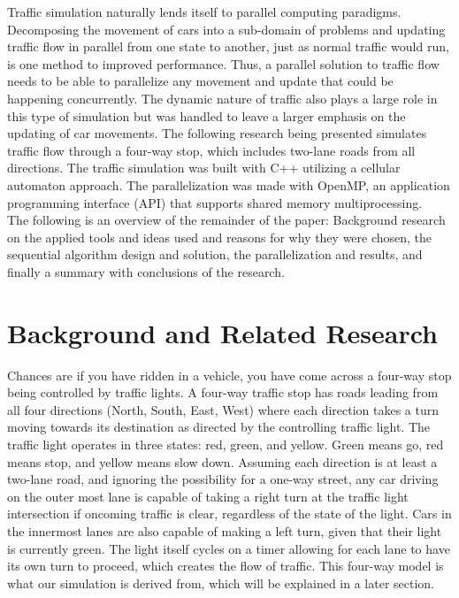 \documentclass[conference]{IEEEtran}
\begin{document}
Traffic simulation naturally lends itself to parallel computing paradigms. Decomposing the movement of cars into a sub-domain of problems and updating traffic flow in parallel from one state to another, just as normal traffic would run, is one method to improved performance. 
Thus, a parallel solution to traffic flow needs to be able to parallelize any movement and update that could be happening concurrently. The dynamic nature of traffic also plays a large role in this type of simulation but was handled to leave a larger emphasis on the updating of car movements. The following research being presented simulates traffic flow through a four-way stop, which includes two-lane roads from all directions. The traffic simulation was built with C++ utilizing a cellular automaton approach.  The parallelization was made with OpenMP, an application programming interface (API) that supports shared memory multiprocessing. \\

The following is an overview of the remainder of the paper: Background research on the applied tools and ideas used and reasons for why they were chosen, the sequential algorithm design and solution, the parallelization and results, and finally a summary with conclusions of the research.
 \\


\section{Background and Related Research}
Chances are if you have ridden in a vehicle, you have come across a four-way stop being controlled by traffic lights. A four-way traffic stop has roads leading from all four directions (North, South, East, West) where each direction takes a turn moving towards its destination as directed by the controlling traffic light. The traffic light operates in three states: red, green, and yellow. Green means go, red means stop, and yellow means slow down. Assuming each direction is at least a two-lane road, and ignoring the possibility for a one-way street, any car driving on the outer most lane is capable of taking a right turn at the traffic light intersection if oncoming traffic is clear, regardless of the state of the light. Cars in the innermost lanes are also capable of making a left turn, given that their light is currently green. The light itself cycles on a timer allowing for each lane to have its own turn to proceed, which creates the flow of traffic. This four-way model is what our simulation is derived from, which will be explained in a later section. \\
\end{document}
